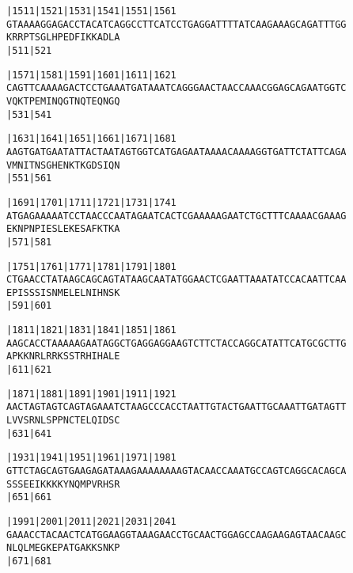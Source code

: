 \documentclass{article}
\begin{document}
\newpage
\begin{alltt}
|1511     |1521     |1531     |1541     |1551     |1561     
GTAAAAGGAGACCTACATCAGGCCTTCATCCTGAGGATTTTATCAAGAAAGCAGATTTGG
  K  R  R  P  T  S  G  L  H  P  E  D  F  I  K  K  A  D  L  A
                    |511                          |521      

|1571     |1581     |1591     |1601     |1611     |1621     
CAGTTCAAAAGACTCCTGAAATGATAAATCAGGGAACTAACCAAACGGAGCAGAATGGTC
  V  Q  K  T  P  E  M  I  N  Q  G  T  N  Q  T  E  Q  N  G  Q
                    |531                          |541      

|1631     |1641     |1651     |1661     |1671     |1681     
AAGTGATGAATATTACTAATAGTGGTCATGAGAATAAAACAAAAGGTGATTCTATTCAGA
  V  M  N  I  T  N  S  G  H  E  N  K  T  K  G  D  S  I  Q  N
                    |551                          |561      

|1691     |1701     |1711     |1721     |1731     |1741     
ATGAGAAAAATCCTAACCCAATAGAATCACTCGAAAAAGAATCTGCTTTCAAAACGAAAG
  E  K  N  P  N  P  I  E  S  L  E  K  E  S  A  F  K  T  K  A
                    |571                          |581      

|1751     |1761     |1771     |1781     |1791     |1801     
CTGAACCTATAAGCAGCAGTATAAGCAATATGGAACTCGAATTAAATATCCACAATTCAA
  E  P  I  S  S  S  I  S  N  M  E  L  E  L  N  I  H  N  S  K
                    |591                          |601      

|1811     |1821     |1831     |1841     |1851     |1861     
AAGCACCTAAAAAGAATAGGCTGAGGAGGAAGTCTTCTACCAGGCATATTCATGCGCTTG
  A  P  K  K  N  R  L  R  R  K  S  S  T  R  H  I  H  A  L  E
                    |611                          |621      

|1871     |1881     |1891     |1901     |1911     |1921     
AACTAGTAGTCAGTAGAAATCTAAGCCCACCTAATTGTACTGAATTGCAAATTGATAGTT
  L  V  V  S  R  N  L  S  P  P  N  C  T  E  L  Q  I  D  S  C
                    |631                          |641      

|1931     |1941     |1951     |1961     |1971     |1981     
GTTCTAGCAGTGAAGAGATAAAGAAAAAAAAGTACAACCAAATGCCAGTCAGGCACAGCA
  S  S  S  E  E  I  K  K  K  K  Y  N  Q  M  P  V  R  H  S  R
                    |651                          |661      

|1991     |2001     |2011     |2021     |2031     |2041     
GAAACCTACAACTCATGGAAGGTAAAGAACCTGCAACTGGAGCCAAGAAGAGTAACAAGC
  N  L  Q  L  M  E  G  K  E  P  A  T  G  A  K  K  S  N  K  P
                    |671                          |681      

\end{alltt}
\end{document}
